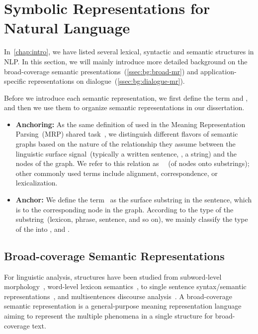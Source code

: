 \section[Symbolic Representations for Natural Language]{Symbolic Representations for \\Natural Language}
\label{sec:bg:symbolic}

In~\autoref{chap:intro}, we have listed several lexical, syntactic and
semantic structures in NLP. In this section, we will mainly introduce
more detailed background on the broad-coverage semantic
presentations~(\autoref{ssec:bg:broad-mr}) and application-specific
representations on dialogue~(\autoref{ssec:bg:dialogue-mr}).

Before we introduce each semantic representation, we first define the
term  and , and then we use them to organize
semantic representations in our dissertation.

\begin{itemize}
\item \textbf{Anchoring:} As the same definition of 
  used in the Meaning Representation Parsing~(MRP) shared
  task~\citep{Oep:Abe:Haj:19}, we distinguish different flavors of
  semantic graphs based on the nature of the relationship they assume
  between the linguistic surface signal~(typically a written sentence,
  \ie, a string) and the nodes of the graph. We refer to this relation
  as ~~(of nodes onto substrings); other commonly used
  terms include alignment, correspondence, or lexicalization.

\item \textbf{Anchor:} We define the term~ as the surface
  substring in the sentence, which is  to the
  corresponding node in the graph. According to the type of the
  substring~(lexicon, phrase, sentence, and so on), we mainly classify
  the type of the  into ,
   and .
\end{itemize}

\subsection{Broad-coverage Semantic Representations}
\label{ssec:bg:broad-mr}

For linguistic analysis, structures have been studied from
subword-level morphology~\citep{beesley2003finite}, word-level lexicon
semantics~\citep{miller1998wordnet}, to single sentence
syntax/semantic
representations~\citep{baker1998berkeley,palmer2005proposition,collins2003head},
and multisentences discourse
analysis~\citep{carlson2003building,wolf2005representing,prasad2008penn}. A
broad-coverage semantic representation is a general-purpose meaning
representation language aiming to represent the multiple phenomena in
a single structure for broad-coverage text.

